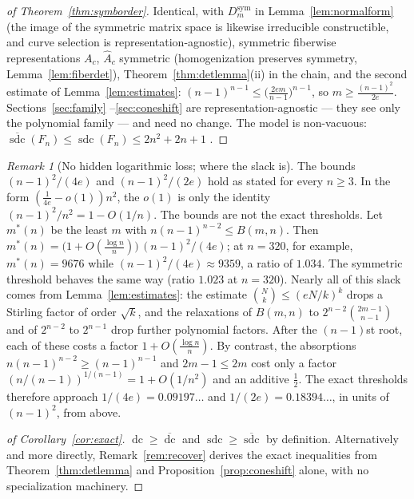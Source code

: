 \documentclass[acmsmall,screen,nonacm]{acmart}
\theoremstyle{definition}
\theoremstyle{remark}
\newtheorem{remark}{Remark}[section]
\DeclareMathOperator{\dc}{dc}
\DeclareMathOperator{\sdc}{sdc}
\newcommand{\dcb}{\overline{\dc}}
\newcommand{\sdcb}{\overline{\sdc}}
\begin{document}
\begin{proof}[of Theorem~\ref{thm:symborder}]
Identical, with $D_m^{\mathrm{sym}}$ in
Lemma~\ref{lem:normalform} (the image of the symmetric matrix space is
likewise irreducible constructible, and curve selection is
representation-agnostic), symmetric fiberwise representations $A_c$,
$\widehat A_c$ symmetric (homogenization preserves symmetry,
Lemma~\ref{lem:fiberdet}), Theorem~\ref{thm:detlemma}(ii) in the
chain, and the second estimate of Lemma~\ref{lem:estimates}:
$(n-1)^{n-1}\le\big(\tfrac{2em}{n-1}\big)^{n-1}$, so
$m\ge\tfrac{(n-1)^2}{2e}$.  Sections~\ref{sec:family}
--\ref{sec:coneshift} are representation-agnostic --- they see only
the polynomial family --- and need no change.  The model is non-vacuous:
$\sdcb(F_n)\le\sdc(F_n)\le2n^2+2n+1$
\cite[Prop.~5.1]{SheshadriSDC}.
\end{proof}

\begin{remark}[No hidden logarithmic loss; where the slack is]
\label{rem:nolog}
The bounds $(n-1)^2/(4e)$ and $(n-1)^2/(2e)$ hold as stated for every
$n\ge3$.  In the form $(\frac{1}{4e}-o(1))n^2$, the $o(1)$ is only the
identity $(n-1)^2/n^2=1-O(1/n)$.  The bounds are not the exact
thresholds.  Let $m^*(n)$ be the least $m$ with
$n(n-1)^{n-2}\le B(m,n)$.  Then
$m^*(n)=\bigl(1+O(\frac{\log n}{n})\bigr)\,(n-1)^2/(4e)$; at $n=320$, for
example, $m^*(n)=9676$ while $(n-1)^2/(4e)\approx9359$, a ratio of
$1.034$.  The symmetric threshold behaves the same way (ratio $1.023$ at
$n=320$).  Nearly all of this slack comes from
Lemma~\ref{lem:estimates}: the estimate $\binom Nk\le(eN/k)^k$ drops a
Stirling factor of order $\sqrt k$, and the relaxations of $B(m,n)$ to
$2^{n-2}\binom{2m-1}{n-1}$ and of $2^{n-2}$ to $2^{n-1}$ drop further
polynomial factors.  After the $(n-1)$st root, each of these costs a
factor $1+O(\frac{\log n}{n})$.  By contrast, the absorptions
$n(n-1)^{n-2}\ge(n-1)^{n-1}$ and $2m-1\le2m$ cost only a factor
$(n/(n-1))^{1/(n-1)}=1+O(1/n^2)$ and an additive $\tfrac12$.  The exact
thresholds therefore approach $1/(4e)=0.09197\ldots$ and
$1/(2e)=0.18394\ldots$, in units of $(n-1)^2$, from above.
\end{remark}

\begin{proof}[of Corollary~\ref{cor:exact}]
$\dc\ge\dcb$ and $\sdc\ge\sdcb$ by definition.  Alternatively and more
directly, Remark~\ref{rem:recover} derives the exact inequalities from
Theorem~\ref{thm:detlemma} and Proposition~\ref{prop:coneshift} alone,
with no specialization machinery.
\end{proof}
\end{document}

